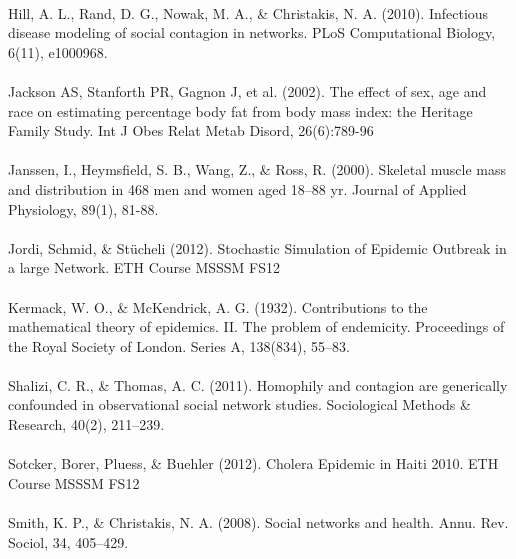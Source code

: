 \documentclass[11pt]{article}
\begin{document}
\paragraph{}
Hill, A. L., Rand, D. G., Nowak, M. A., \& Christakis, N. A. (2010). Infectious disease modeling of social contagion in networks. PLoS Computational Biology, 6(11), e1000968.
\paragraph{}
Jackson AS, Stanforth PR, Gagnon J, et al. (2002). The effect of sex, age and race on estimating percentage body fat from body mass index: the Heritage Family Study. Int J Obes Relat Metab Disord, 26(6):789-96
\paragraph{}
Janssen, I., Heymsfield, S. B., Wang, Z., & Ross, R. (2000). Skeletal muscle mass and distribution in 468 men and women aged 18–88 yr. Journal of Applied Physiology, 89(1), 81-88.
 \paragraph{}
Jordi, Schmid, \& Stücheli (2012). Stochastic Simulation of Epidemic Outbreak in a large Network. ETH Course MSSSM FS12
\paragraph{}
Kermack, W. O., \& McKendrick, A. G. (1932). Contributions to the mathematical theory of epidemics. II. The problem of endemicity. Proceedings of the Royal Society of London. Series A, 138(834), 55–83.
\paragraph{}
Shalizi, C. R., \& Thomas, A. C. (2011). Homophily and contagion are generically confounded in observational social network studies. Sociological Methods & Research, 40(2), 211–239.
\paragraph{}
Sotcker, Borer, Pluess, \& Buehler (2012). Cholera Epidemic in Haiti 2010. ETH Course MSSSM FS12
\paragraph{}
Smith, K. P., \& Christakis, N. A. (2008). Social networks and health. Annu. Rev. Sociol, 34, 405–429.
\end{document}
